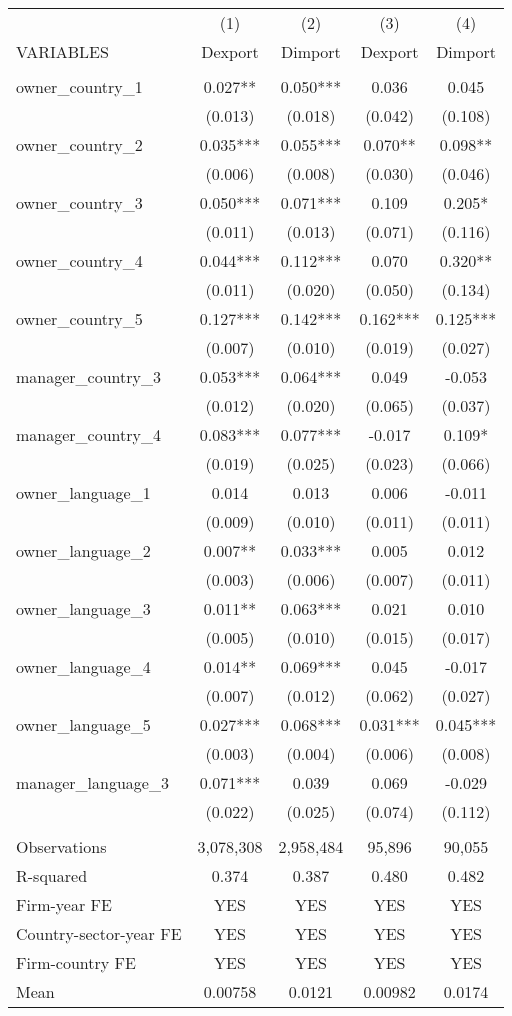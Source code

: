 \begin{tabular}{lcccc} \hline
 & (1) & (2) & (3) & (4) \\
VARIABLES & Dexport & Dimport & Dexport & Dimport \\ \hline
 &  &  &  &  \\
owner\_country\_1 & 0.027** & 0.050*** & 0.036 & 0.045 \\
 & (0.013) & (0.018) & (0.042) & (0.108) \\
owner\_country\_2 & 0.035*** & 0.055*** & 0.070** & 0.098** \\
 & (0.006) & (0.008) & (0.030) & (0.046) \\
owner\_country\_3 & 0.050*** & 0.071*** & 0.109 & 0.205* \\
 & (0.011) & (0.013) & (0.071) & (0.116) \\
owner\_country\_4 & 0.044*** & 0.112*** & 0.070 & 0.320** \\
 & (0.011) & (0.020) & (0.050) & (0.134) \\
owner\_country\_5 & 0.127*** & 0.142*** & 0.162*** & 0.125*** \\
 & (0.007) & (0.010) & (0.019) & (0.027) \\
manager\_country\_3 & 0.053*** & 0.064*** & 0.049 & -0.053 \\
 & (0.012) & (0.020) & (0.065) & (0.037) \\
manager\_country\_4 & 0.083*** & 0.077*** & -0.017 & 0.109* \\
 & (0.019) & (0.025) & (0.023) & (0.066) \\
owner\_language\_1 & 0.014 & 0.013 & 0.006 & -0.011 \\
 & (0.009) & (0.010) & (0.011) & (0.011) \\
owner\_language\_2 & 0.007** & 0.033*** & 0.005 & 0.012 \\
 & (0.003) & (0.006) & (0.007) & (0.011) \\
owner\_language\_3 & 0.011** & 0.063*** & 0.021 & 0.010 \\
 & (0.005) & (0.010) & (0.015) & (0.017) \\
owner\_language\_4 & 0.014** & 0.069*** & 0.045 & -0.017 \\
 & (0.007) & (0.012) & (0.062) & (0.027) \\
owner\_language\_5 & 0.027*** & 0.068*** & 0.031*** & 0.045*** \\
 & (0.003) & (0.004) & (0.006) & (0.008) \\
manager\_language\_3 & 0.071*** & 0.039 & 0.069 & -0.029 \\
 & (0.022) & (0.025) & (0.074) & (0.112) \\
 &  &  &  &  \\
Observations & 3,078,308 & 2,958,484 & 95,896 & 90,055 \\
R-squared & 0.374 & 0.387 & 0.480 & 0.482 \\
Firm-year FE & YES & YES & YES & YES \\
Country-sector-year FE & YES & YES & YES & YES \\
Firm-country FE & YES & YES & YES & YES \\
 Mean & 0.00758 & 0.0121 & 0.00982 & 0.0174 \\ \hline
\end{tabular}
